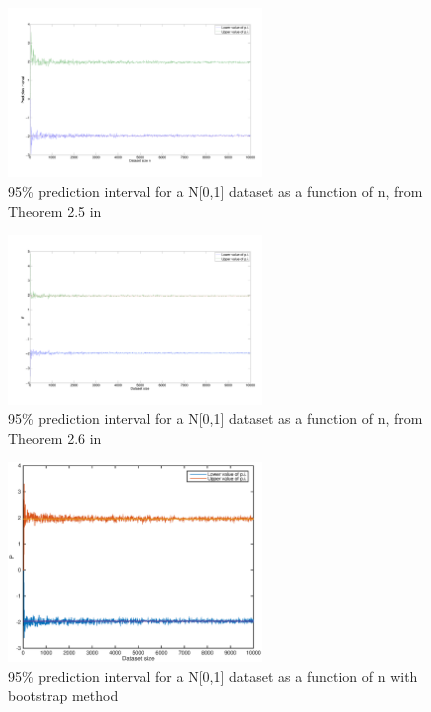 \documentclass[10pt]{article}
\begin{document}
\begin{figure}[h!]
  \centering
  \includegraphics[width=0.6\textwidth]{images/hw1_4_d_norm_order}
  \caption{95\% prediction interval for a N[0,1] dataset as a function of n, from Theorem 2.5 in \cite{leb}}
  \label{fig:pi_norm}
\end{figure}

\begin{figure}
  \centering
  \includegraphics[width=0.6\textwidth]{images/hw1_4_d_norm}
  \caption{95\% prediction interval for a N[0,1] dataset as a function of n, from Theorem 2.6 in \cite{leb}}
  \label{fig:pi_norm_th}
\end{figure}

\begin{figure}
  \centering
  \includegraphics[width=0.6\textwidth]{images/hw1_4_d_norm_boot}
  \caption{95\% prediction interval for a N[0,1] dataset as a function of n with bootstrap method}
  \label{fig:pi_norm_boot}
\end{figure}
\end{document}
